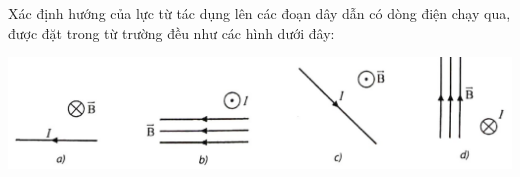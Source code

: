 \begin{ex}
	Xác định hướng của lực từ tác dụng lên các đoạn dây dẫn có dòng điện chạy qua, được đặt trong từ trường đều như các hình dưới đây:
	\begin{center}
		\includegraphics[width=0.8\linewidth]{figs/VN12-Y24-PH-SYL-018P-3}
	\end{center}
\end{ex}
